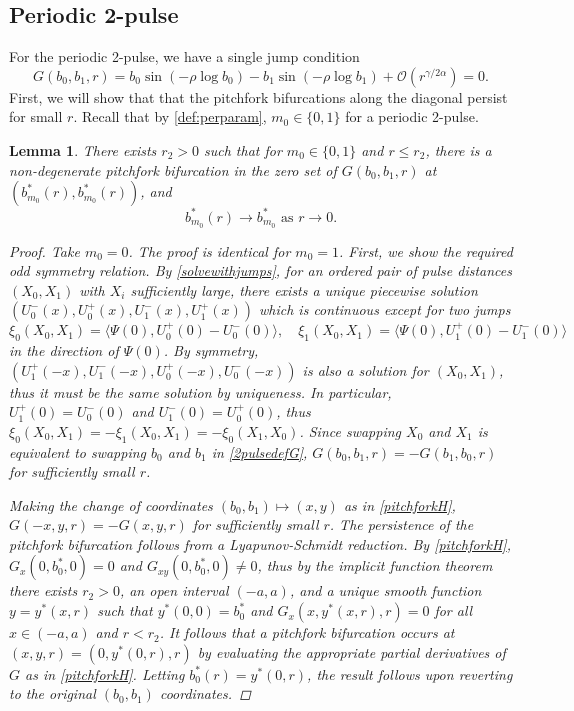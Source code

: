 \documentclass[12pt]{elsarticle}
\theoremstyle{plain}
\newtheorem{lemma}[theorem]{Lemma}
\theoremstyle{definition}
\theoremstyle{remark}
\numberwithin{theorem}{section}
\numberwithin{equation}{section}
\begin{document}
\subsection{Periodic 2-pulse}

For the periodic 2-pulse, we have a single jump condition
\begin{equation}\label{2pulsedefG}
G(b_0, b_1, r) = b_0 \sin \left( -\rho \log b_0 \right) - b_1 \sin \left( -\rho \log b_1 \right) + \mathcal{O}(r^{\gamma / 2 \alpha}) = 0.
\end{equation}
First, we will show that that the pitchfork bifurcations along the diagonal persist for small $r$. Recall that by \cref{def:perparam}, $m_0 \in \{0, 1\}$ for a periodic 2-pulse.

\begin{lemma}\label{pitchpersist}
There exists $r_2 > 0$ such that for $m_0 \in \{0, 1\}$ and $r \leq r_2$, there is a non-degenerate pitchfork bifurcation in the zero set of $G(b_0, b_1, r)$ at $(b_{m_0}^*(r),b_{m_0}^*(r))$, and 
\begin{equation*}
b_{m_0}^*(r) \rightarrow b_{m_0}^* \text{ as } r \rightarrow 0.
\end{equation*}
\begin{proof}
Take $m_0 = 0$. The proof is identical for $m_0 = 1$. First, we show the required odd symmetry relation. By \cref{solvewithjumps}, for an ordered pair of pulse distances $(X_0, X_1)$ with $X_i$ sufficiently large, there exists a unique piecewise solution $(U_0^-(x), U_0^+(x), U_1^-(x), U_1^+(x))$ which is continuous except for two jumps 
\begin{equation}\label{xijumps}
\xi_0(X_0, X_1) = \langle \Psi(0), U_0^+(0) - U_0^-(0) \rangle, \quad
\xi_1(X_0, X_1) = \langle \Psi(0), U_1^+(0) - U_1^-(0) \rangle 
\end{equation}
in the direction of $\Psi(0)$. By symmetry, $(U_1^+(-x), U_1^-(-x), U_0^+(-x), U_0^-(-x))$ is also a solution for $(X_0, X_1)$, thus it must be the same solution by uniqueness. In particular, $U_1^+(0) = U_0^-(0)$ and $U_1^-(0) = U_0^+(0)$, thus $\xi_0(X_0, X_1) = -\xi_1(X_0, X_1) = -\xi_0(X_1, X_0)$. Since swapping $X_0$ and $X_1$ is equivalent to swapping $b_0$ and $b_1$ in \cref{2pulsedefG}, $G(b_0, b_1, r) = -G(b_1, b_0, r)$ for sufficiently small $r$. 

Making the change of coordinates $(b_0, b_1) \mapsto (x, y)$ as in \cref{pitchforkH}, $G(-x, y, r) = -G(x, y, r)$ for sufficiently small $r$. The persistence of the pitchfork bifurcation follows from a Lyapunov-Schmidt reduction.  By \cref{pitchforkH}, $G_x(0, b_0^*, 0) = 0$ and $G_{xy}(0, b_0^*, 0) \neq 0$, thus by the implicit function theorem there exists $r_2 > 0$, an open interval $(-a, a)$, and a unique smooth function $y = y^*(x, r)$ such that $y^*(0, 0) = b_0^*$ and $G_x(x, y^*(x, r), r) = 0$ for all $x \in (-a, a)$ and $r < r_2$. It follows that a pitchfork bifurcation occurs at $(x, y, r) = (0, y^*(0, r), r)$ by evaluating the appropriate partial derivatives of $G$ as in \cref{pitchforkH}. Letting $b_0^*(r) = y^*(0, r)$, the result follows upon reverting to the original $(b_0, b_1)$ coordinates.
\end{proof} 
\end{lemma}
\end{document}
